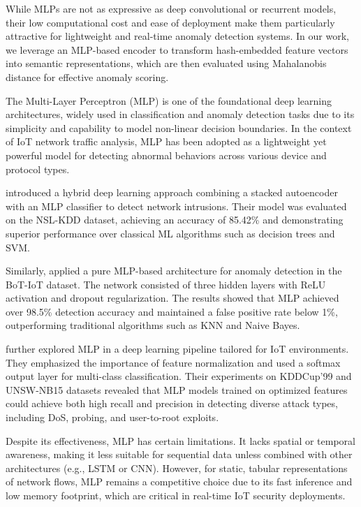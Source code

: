 \begin{ZhChapter}
    While MLPs are not as expressive as deep convolutional or recurrent models, their low computational cost and ease of deployment make them particularly attractive for lightweight and real-time anomaly detection systems. In our work, we leverage an MLP-based encoder to transform hash-embedded feature vectors into semantic representations, which are then evaluated using Mahalanobis distance for effective anomaly scoring.

    The Multi-Layer Perceptron (MLP) is one of the foundational deep learning architectures, widely used in classification and anomaly detection tasks due to its simplicity and capability to model non-linear decision boundaries. In the context of IoT network traffic analysis, MLP has been adopted as a lightweight yet powerful model for detecting abnormal behaviors across various device and protocol types.

    \cite{shone2018deep} introduced a hybrid deep learning approach combining a stacked autoencoder with an MLP classifier to detect network intrusions. Their model was evaluated on the NSL-KDD dataset, achieving an accuracy of 85.42\% and demonstrating superior performance over classical ML algorithms such as decision trees and SVM.

    Similarly, \cite{rahman2020deep} applied a pure MLP-based architecture for anomaly detection in the BoT-IoT dataset. The network consisted of three hidden layers with ReLU activation and dropout regularization. The results showed that MLP achieved over 98.5\% detection accuracy and maintained a false positive rate below 1\%, outperforming traditional algorithms such as KNN and Naive Bayes.

    \cite{javaid2016deep} further explored MLP in a deep learning pipeline tailored for IoT environments. They emphasized the importance of feature normalization and used a softmax output layer for multi-class classification. Their experiments on KDDCup'99 and UNSW-NB15 datasets revealed that MLP models trained on optimized features could achieve both high recall and precision in detecting diverse attack types, including DoS, probing, and user-to-root exploits.

    Despite its effectiveness, MLP has certain limitations. It lacks spatial or temporal awareness, making it less suitable for sequential data unless combined with other architectures (e.g., LSTM or CNN). However, for static, tabular representations of network flows, MLP remains a competitive choice due to its fast inference and low memory footprint, which are critical in real-time IoT security deployments.


\end{ZhChapter}
